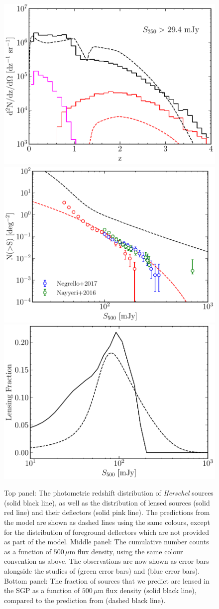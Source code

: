 \begin{figure}
    \centering
    \includegraphics[width=0.55\columnwidth,height=0.255\textheight]{Figures/Figure_2_12a.pdf}
    \includegraphics[width=0.55\columnwidth,height=0.255\textheight]{Figures/Figure_2_12b.pdf}
    \includegraphics[width=0.55\columnwidth,height=0.255\textheight]{Figures/Figure_2_12c.pdf}
    \caption[Comparison of our unlensed and lensed galaxy populations]{Top panel: The photometric redshift distribution of \textit{Herschel} sources (solid black line), as well as the distribution of lensed sources (solid red line) and their deflectors (solid pink line). The predictions from the \citealt{Cai_2013} model are shown as dashed lines using the same colours, except for the distribution of foreground deflectors which are not provided as part of the model. Middle panel: The cumulative number counts as a function of $500\,\mu$m flux density, using the same colour convention as above. The observations are now shown as error bars alongside the studies of \citealt{Nayyeri_2016} (green error bars) and \citealt{Negrello_2017} (blue error bars). Bottom panel: The fraction of sources that we predict are lensed in the SGP as a function of $500\,\mu$m flux density (solid black line), compared to the prediction from \citealt{Cai_2013} (dashed black line).
    \label{fig:lens_distributions_against_cai}}
\end{figure}

